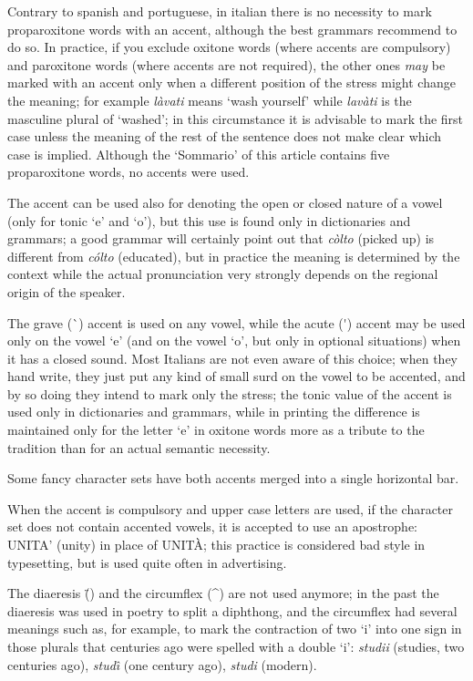 \documentclass{ltugboat}
\newenvironment{comment}{\begingroup\setbox0\vbox\bgroup}{\egroup\endgroup}
\begin{document}
Contrary to spanish and portuguese, in italian there is no necessity to mark
proparoxitone words with an accent, although the best grammars recommend  to
do  so.  In  practice,  if  you  exclude  oxitone  words  (where accents are
compulsory) and paroxitone words (where accents are not required), the other
ones  {\it  may}  be marked with an accent only when a different position of
the stress might change the meaning; for example {\it l\`avati} means  `wash
yourself'  while {\it lav\`ati} is the masculine plural of `washed'; in this
circumstance it is advisable to mark the first case  unless the  meaning  of
the rest of the sentence does not make clear which case is implied. Although
the `Sommario' of this article contains five proparoxitone words, no accents
were used.

The  accent  can  be  used  also for denoting the open or closed nature of a
vowel (only for  tonic  `e'  and  `o'),  but  this  use  is  found  only  in
dictionaries and grammars; a good grammar will certainly point out that {\it
c\`olto} (picked up) is different from  {\it  c\'olto}  (educated),  but  in
practice  the  meaning  is  determined  by  the  context  while  the  actual
pronunciation very strongly depends on the regional origin of the speaker.

The  grave (\`{}) accent is used on any vowel, while the acute (\'{}) accent
may be used only on the vowel `e'  (and  on  the  vowel  `o',  but  only  in
optional  situations) when it has a closed sound. Most Italians are not even
aware of this choice; when they hand write, they just put any kind of  small
surd  on  the vowel to be accented, and by so doing they intend to mark only
the stress; the tonic value of the accent is used only in  dictionaries  and
grammars, while in printing the difference is maintained only for the letter
`e' in oxitone words more as a tribute to the tradition than for  an  actual
semantic  necessity. 

\begin{comment}
Some  fancy character sets have both accents merged into a single horizontal
bar. 
\end{comment}

When  the  accent  is  compulsory  and  upper  case letters are used, if the
character set does not contain accented vowels, it is  accepted  to  use  an
apostrophe:  UNITA' (unity) in place of UNIT\`A; this practice is considered
bad style in typesetting, but is used quite often in advertising.

The  diaeresis (\"{}) and the circumflex (\^{}) are not used anymore; in the
past the diaeresis was  used  in  poetry  to  split  a  diphthong,  and  the
circumflex   had  several  meanings  such  as,  for  example,  to  mark  the
contraction of two `i' into one sign in those  plurals  that  centuries  ago
were  spelled  with a double `i': {\it studii} (studies, two centuries ago),
{\it stud\^\i} (one century ago), {\it studi} (modern).
\end{document}
